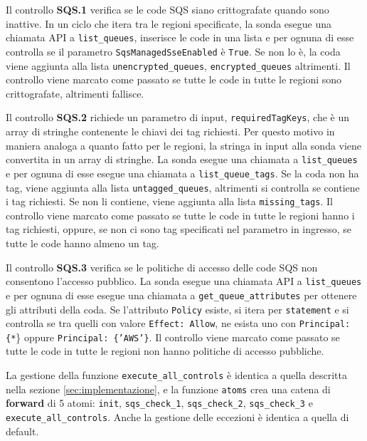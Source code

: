 Il controllo \textbf{SQS.1} verifica se le code SQS siano crittografate quando sono inattive. In un ciclo che itera tra le regioni specificate, la sonda esegue una chiamata API a \texttt{list\_queues}, inserisce le code in una lista e per ognuna di esse controlla se il parametro \texttt{SqsManagedSseEnabled} è \texttt{True}. Se non lo è, la coda viene aggiunta alla lista \texttt{unencrypted\_queues}, \texttt{encrypted\_queues} altrimenti. Il controllo viene marcato come passato se tutte le code in tutte le regioni sono crittografate, altrimenti fallisce.

Il controllo \textbf{SQS.2} richiede un parametro di input, \texttt{requiredTagKeys}, che è un array di stringhe contenente le chiavi dei tag richiesti. Per questo motivo in maniera analoga a quanto fatto per le regioni, la stringa in input alla sonda viene convertita in un array di stringhe. La sonda esegue una chiamata a \texttt{list\_queues} e per ognuna di esse esegue una chiamata a \texttt{list\_queue\_tags}. Se la coda non ha tag, viene aggiunta alla lista \texttt{untagged\_queues}, altrimenti si controlla se contiene i tag richiesti. Se non li contiene, viene aggiunta alla lista \texttt{missing\_tags}. Il controllo viene marcato come passato se tutte le code in tutte le regioni hanno i tag richiesti, oppure, se non ci sono tag specificati nel parametro in ingresso, se tutte le code hanno almeno un tag.

Il controllo \textbf{SQS.3} verifica se le politiche di accesso delle code SQS non consentono l'accesso pubblico. La sonda esegue una chiamata API a \texttt{list\_queues} e per ognuna di esse esegue una chiamata a \texttt{get\_queue\_attributes} per ottenere gli attributi della coda. Se l'attributo \texttt{Policy} esiste, si itera per \texttt{statement} e si controlla se tra quelli con valore \texttt{Effect: Allow}, ne esista uno con \texttt{Principal: \{*}\} oppure \texttt{Principal: \{'AWS'\}}. Il controllo viene marcato come passato se tutte le code in tutte le regioni non hanno politiche di accesso pubbliche.

La gestione della funzione \texttt{execute\_all\_controls} è identica a quella descritta nella sezione \ref{sec:implementazione}, e la funzione \texttt{atoms} crea una catena di \textbf{forward} di 5 atomi: \texttt{init}, \texttt{sqs\_check\_1}, \texttt{sqs\_check\_2}, \texttt{sqs\_check\_3} e \texttt{execute\_all\_controls}. Anche la gestione delle eccezioni è identica a quella di default.

\vspace{1em}

